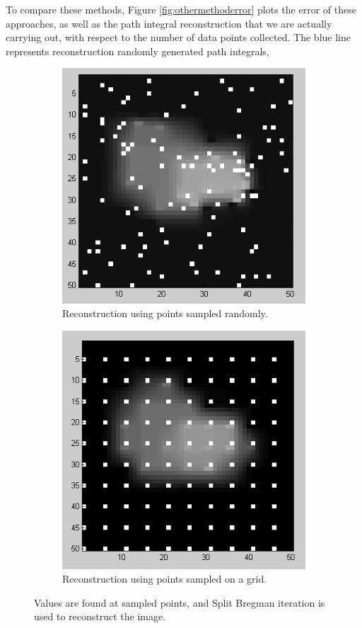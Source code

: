 \documentclass[english]{article}\usepackage[]{graphicx}\usepackage[]{color}
\begin{document}
To compare these methods, Figure \ref{fig:othermethoderror} plots the error of these approaches, as well as the path integral reconstruction that we are actually carrying out, with respect to the number of data points collected. The blue line represents reconstruction randomly generated path integrals,

\begin{figure}
\centering
\begin{subfigure}{.5\textwidth}
  \centering
    \includegraphics[width=.9\linewidth]{figures/randompointreconstruction}
  \caption{Reconstruction using points sampled randomly.}
  \label{fig:randrec}
\end{subfigure}%
\begin{subfigure}{.5\textwidth}
  \centering
    \includegraphics[width=.9\linewidth]{figures/gridpointreconstruction}
  \caption{Reconstruction using points sampled on a grid.}
  \label{fig:gridrec}
\end{subfigure}
\caption{Values are found at sampled points, and Split Bregman iteration is used to reconstruct the image.}
\label{fig:samplerec}
\end{figure}
\end{document}
